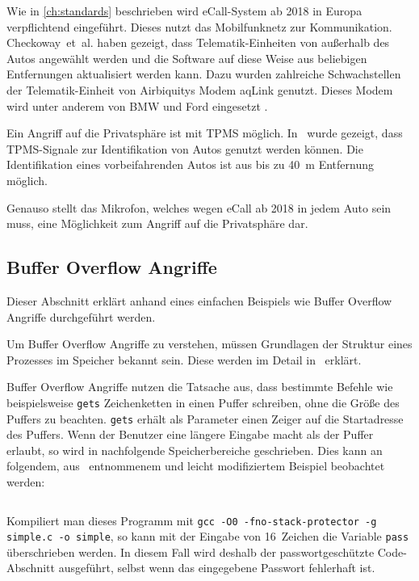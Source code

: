 Wie in \cref{ch:standards} beschrieben wird eCall-System ab 2018 in Europa
verpflichtend eingeführt. Dieses nutzt das Mobilfunknetz zur Kommunikation.
Checkoway~et~al. haben gezeigt, dass Telematik-Einheiten von außerhalb des
Autos angewählt werden und die Software auf diese Weise aus beliebigen
Entfernungen aktualisiert werden kann. Dazu wurden zahlreiche Schwachstellen
der Telematik-Einheit von Airbiquitys Modem aqLink genutzt. Dieses Modem wird
unter anderem von BMW und Ford eingesetzt \cite{AirbiquityBMW,AirbiquityFord}.

Ein Angriff auf die Privatsphäre ist mit TPMS möglich. In~\cite{Rouf2010} wurde
gezeigt, dass TPMS-Signale zur Identifikation von Autos genutzt werden können.
Die Identifikation eines vorbeifahrenden Autos ist aus bis zu \SI{40}{\meter}
Entfernung möglich.

Genauso stellt das Mikrofon, welches wegen eCall ab 2018 in jedem Auto sein
muss, eine Möglichkeit zum Angriff auf die Privatsphäre dar.


\subsection{Buffer Overflow Angriffe}\label{sec:Buffer-Overflow}
Dieser Abschnitt erklärt anhand eines einfachen Beispiels wie Buffer Overflow
Angriffe durchgeführt werden.

Um Buffer Overflow Angriffe zu verstehen, müssen Grundlagen der Struktur eines
Prozesses im Speicher bekannt sein. Diese werden im Detail
in~\cite{Silberschatz2005} erklärt.

Buffer Overflow Angriffe nutzen die Tatsache aus, dass bestimmte Befehle wie
beispielsweise \verb+gets+ Zeichenketten in einen Puffer schreiben, ohne die
Größe des Puffers zu beachten. \verb+gets+ erhält als Parameter einen Zeiger
auf die Startadresse des Puffers. Wenn der Benutzer eine längere Eingabe macht
als der Puffer erlaubt, so wird in nach\-folgende Speicher\-bereiche
geschrieben. Dies kann an folgendem, aus~\cite{Arora2013} entnommenem und
leicht modifiziertem Beispiel beobachtet werden:

\inputminted[linenos, numbersep=5pt, tabsize=4, frame=lines, label=simple.c]{c}{simple.c}

Kompiliert man dieses Programm mit
\texttt{gcc -O0 -fno-stack-protector -g simple.c -o simple}, so kann mit der
Eingabe von 16~Zeichen die Variable \texttt{pass} überschrieben werden. In diesem
Fall wird deshalb der passwortgeschützte Code-Abschnitt ausgeführt, selbst
wenn das eingegebene Passwort fehlerhaft ist.

